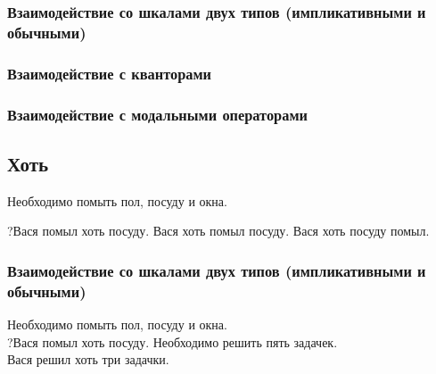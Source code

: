 \documentclass[a4paper, titlepage, 12pt]{article}
\begin{document}
\subsubsection{Взаимодействие со шкалами двух типов (импликативными и обычными)}

\begin{exe}
    \ex \begin{xlist}
        \ex
        \ex
    \end{xlist}
\end{exe}

\subsubsection{Взаимодействие с кванторами}

\begin{exe}
    \ex \begin{xlist}
        \ex
        \ex
    \end{xlist}
\end{exe}

\subsubsection{Взаимодействие с модальными операторами}

\begin{exe}
    \ex \begin{xlist}
        \ex
        \ex
    \end{xlist}
\end{exe}


\subsection{Хоть} \label{xot}

\begin{exe}
    \ex Необходимо помыть пол, посуду и окна. \begin{xlist}
        \ex ?Вася помыл хоть посуду.
        \ex Вася хоть помыл посуду.
        \ex Вася хоть посуду помыл.
    \end{xlist}
\end{exe}

\subsubsection{Взаимодействие со шкалами двух типов (импликативными и обычными)}

\begin{exe}
    \ex \begin{xlist}
        \ex Необходимо помыть пол, посуду и окна. \\
        ?Вася помыл хоть посуду.
        \ex Необходимо решить пять задачек. \\
        Вася решил хоть три задачки.
    \end{xlist}
\end{exe}
\end{document}
